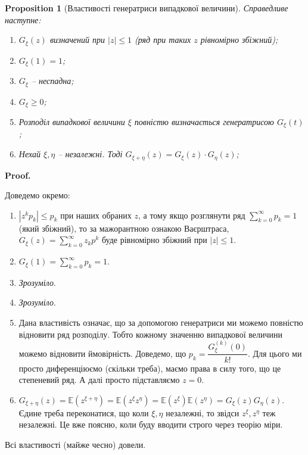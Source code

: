 \documentclass[a4paper, 10pt]{article}
\makeatletter
\theoremstyle{theoremdd}
\newtheorem{proposition}[theorem]{Proposition}
\renewenvironment{proof}[1][Proof.\\]{\par
\pushQED{\hfill \qed}%
\normalfont \topsep6\p@\@plus6\p@\relax
\trivlist
\item\relax
{\bfseries
#1\@addpunct{.}}\hspace\labelsep\ignorespaces
}{%
\popQED\endtrivlist\@endpefalse
}
\makeatother
\begin{document}
\begin{proposition}[Властивості генератриси випадкової величини]
Справедливе наступне:
\begin{enumerate}[nosep,wide=0pt,label={\arabic*)}]
\item $G_\xi(z)$ визначений при $|z| \leq 1$ (ряд при таких $z$ рівномірно збіжний);
\item $G_\xi(1) = 1$;
\item $G_\xi$ -- неспадна;
\item $G_\xi \geq 0$;
\item Розподіл випадкової величини $\xi$ повністю визначається генератрисою $G_\xi(t)$;
\item Нехай $\xi,\eta$ -- незалежні. Тоді $G_{\xi + \eta}(z) = G_\xi(z) \cdot G_\eta(z)$;
\end{enumerate}
\end{proposition}

\begin{proof}
Доведемо окремо:
\begin{enumerate}[wide=0pt,label={\arabic*)}]
\item $|z^k p_k| \leq p_k$ при наших обраних $z$, а тому якщо розглянути ряд $\displaystyle\sum_{k=0}^\infty p_k = 1$ (який збіжний), то за мажорантною ознакою Ваєрштраса, $G_\xi(z) = \displaystyle\sum_{k=0}^\infty z_k p^k$ буде рівномірно збіжний при $|z| \leq 1$.
\item $G_\xi(1) = \displaystyle\sum_{k=0}^\infty p_k = 1$.
\item \textit{Зрозуміло}.
\item \textit{Зрозуміло}.
\item Дана властивість означає, що за допомогою генератриси ми можемо повністю відновити ряд розподілу. Тобто кожному значенню випадкової величини можемо відновити ймовірність. Доведемо, що $p_k = \dfrac{G_\xi^{(k)}(0)}{k!}$. Для цього ми просто диференціюємо (скільки треба), маємо права в силу того, що це степеневий ряд. А далі просто підставляємо $z = 0$.
\item $G_{\xi + \eta}(z) = \mathbb{E}(z^{\xi + \eta}) = \mathbb{E}(z^{\xi}z^{\eta}) = \mathbb{E}(z^\xi) \mathbb{E}(z^\eta) = G_\xi(z) G_\eta(z)$.\\
Єдине треба переконатися, що коли $\xi,\eta$ незалежні, то звідси $z^\xi, z^\eta$ теж незалежні. Це вже поясню, коли буду вводити строго через теорію міри.
\end{enumerate}
Всі властивості (майже чесно) довели.
\end{proof}
\end{document}
